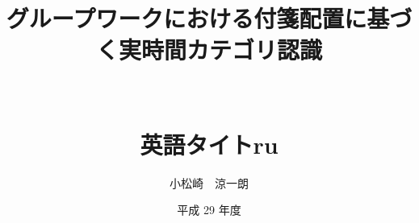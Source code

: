 \documentclass[10pt,a4paper]{jmasterthesis}
\begin{document}
\title{
\huge{グループワークにおける付箋配置に基づく実時間カテゴリ認識}\\
\LARGE{}\\
\huge{}\\英語タイトru
\LARGE{}
}


\author{小松崎　涼一朗}
\date{平成 29 年度}

\maketitle



\tableofcontents
\listoffigures 
\listoftables

\clearpage

\setcounter{page}{1}







%



%


\end{document}
